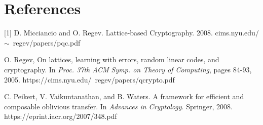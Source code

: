 \section{References}\label{sec:references}
[1] D. Micciancio and O. Regev. Lattice-based Cryptography. 2008. cims.nyu.edu/$\sim$~regev/papers/pqc.pdf

\noindent [2] O. Regev, On lattices, learning with errors, random linear codes,
and cryptography. In \textit{Proc. 37th ACM Symp. on Theory of Computing}, pages 84-93, 2005. https://cims.nyu.edu/~regev/papers/qcrypto.pdf

\noindent [3] C. Peikert, V. Vaikuntanathan, and B. Waters. A framework for
efficient and composable oblivious transfer. In \textit{Advances in
Cryptology}. Springer, 2008. https://eprint.iacr.org/2007/348.pdf
